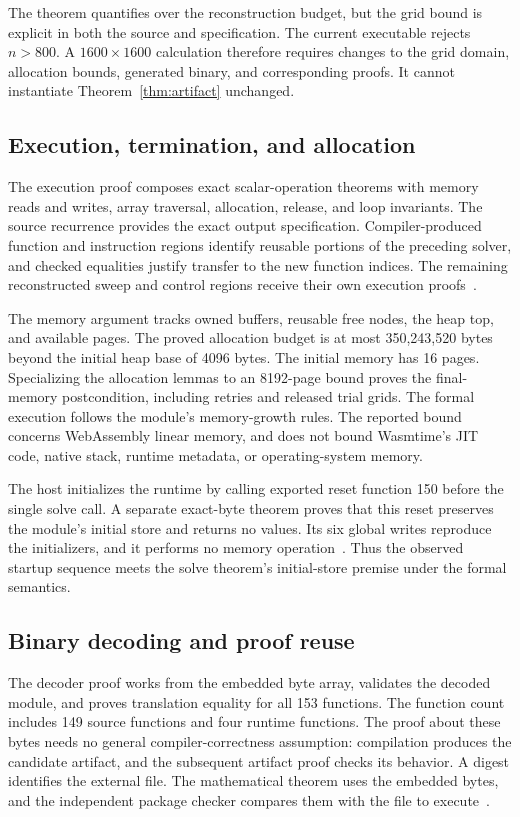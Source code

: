 \documentclass[11pt]{article}
\begin{document}
The theorem quantifies over the reconstruction budget, but the grid bound is explicit in both the source and specification.  The current executable rejects $n>800$.  A $1600\times1600$ calculation therefore requires changes to the grid domain, allocation bounds, generated binary, and corresponding proofs.  It cannot instantiate Theorem~\ref{thm:artifact} unchanged.

\subsection{Execution, termination, and allocation}

The execution proof composes exact scalar-operation theorems with memory reads and writes, array traversal, allocation, release, and loop invariants.  The source recurrence provides the exact output specification.  Compiler-produced function and instruction regions identify reusable portions of the preceding solver, and checked equalities justify transfer to the new function indices.  The remaining reconstructed sweep and control regions receive their own execution proofs~\cite{execution}.

The memory argument tracks owned buffers, reusable free nodes, the heap top, and available pages.  The proved allocation budget is at most 350,243,520 bytes beyond the initial heap base of 4096 bytes.  The initial memory has 16 pages.  Specializing the allocation lemmas to an 8192-page bound proves the final-memory postcondition, including retries and released trial grids.  The formal execution follows the module's memory-growth rules.  The reported bound concerns WebAssembly linear memory, and does not bound Wasmtime's JIT code, native stack, runtime metadata, or operating-system memory.

The host initializes the runtime by calling exported reset function 150 before the single solve call.  A separate exact-byte theorem proves that this reset preserves the module's initial store and returns no values.  Its six global writes reproduce the initializers, and it performs no memory operation~\cite{hostinitial}.  Thus the observed startup sequence meets the solve theorem's initial-store premise under the formal semantics.

\subsection{Binary decoding and proof reuse}

The decoder proof works from the embedded byte array, validates the decoded module, and proves translation equality for all 153 functions.  The function count includes 149 source functions and four runtime functions.  The proof about these bytes needs no general compiler-correctness assumption: compilation produces the candidate artifact, and the subsequent artifact proof checks its behavior.  A digest identifies the external file.  The mathematical theorem uses the embedded bytes, and the independent package checker compares them with the file to execute~\cite{artifact}.
\end{document}
